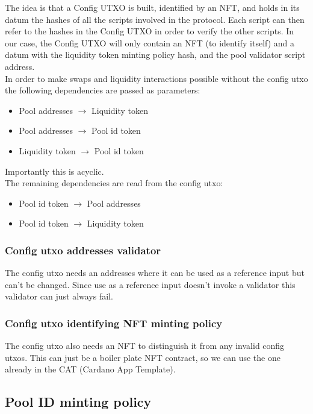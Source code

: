 \documentclass{article}
\begin{document}
The idea is that a Config UTXO is built, identified by an NFT, and holds in
its datum the hashes of all the scripts involved in the protocol. Each script
can then refer to the hashes in the Config UTXO in order to verify the other
scripts. In our case, the Config UTXO will only contain an NFT (to identify
itself) and a datum with the liquidity token
minting policy hash, and the pool validator script address. \\

In order to make swaps and liquidity interactions possible without
the config utxo the following dependencies are passed as parameters:
\begin{itemize}
	\item Pool addresses $\rightarrow$ Liquidity token
	\item Pool addresses $\rightarrow$ Pool id token
	\item Liquidity token $\rightarrow$ Pool id token
\end{itemize}
Importantly this is acyclic. \\

The remaining dependencies are read from the config utxo:
\begin{itemize}
	\item Pool id token $\rightarrow$ Pool addresses
	\item Pool id token $\rightarrow$ Liquidity token
\end{itemize}

\subsubsection{Config utxo addresses validator}

The config utxo needs an addresses where it can be used as a reference
input but can't be changed. Since use as a reference input doesn't
invoke a validator this validator can just always fail.

\subsubsection{Config utxo identifying NFT minting policy}

The config utxo also needs an NFT to distinguish it from any
invalid config utxos. This can just be a boiler plate NFT contract,
so we can use the one already in the CAT (Cardano App Template).

\subsection{Pool ID minting policy}
\end{document}
